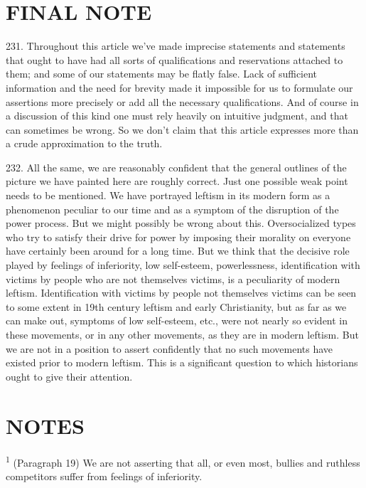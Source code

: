 \documentclass{article}
\begin{document}
\section{FINAL NOTE}

\hspace{0.5cm} 231. Throughout this article we’ve made imprecise statements and statements that ought to have 
had all sorts of qualifications and reservations attached to them; and some of our statements may 
be flatly false. Lack of sufficient information and the need for brevity made it impossible for us 
to formulate our assertions more precisely or add all the necessary qualifications. And of course 
in a discussion of this kind one must rely heavily on intuitive judgment, and that can sometimes 
be wrong. So we don’t claim that this article expresses more than a crude approximation to the 
truth. \vspace{\baselineskip} 

232. All the same, we are reasonably confident that the general outlines of the picture we have 
painted here are roughly correct. Just one possible weak point needs to be mentioned. We have portrayed 
leftism in its modern form as a phenomenon peculiar to our time and as a symptom of 
the disruption of the power process. But we might possibly be wrong about this. Oversocialized 
types who try to satisfy their drive for power by imposing their morality on everyone have certainly 
been around for a long time. But we think that the decisive role played by feelings of inferiority, 
low self-esteem, powerlessness, identification with victims by people who are not themselves
victims, is a peculiarity of modern leftism. Identification with victims by people not themselves 
victims can be seen to some extent in 19th century leftism and early Christianity, but as far as we 
can make out, symptoms of low self-esteem, etc., were not nearly so evident in these movements, 
or in any other movements, as they are in modern leftism. But we are not in a position to assert 
confidently that no such movements have existed prior to modern leftism. This is a significant 
question to which historians ought to give their attention. 

\afterpage{\null\newpage}
\newpage

\section{NOTES}

\hspace{0.5cm} \textsuperscript{1} (Paragraph 19) We are not asserting that all, or even most, bullies and ruthless competitors 
suffer from feelings of inferiority. \vspace{\baselineskip} 
\end{document}
